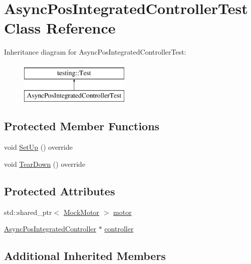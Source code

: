 \hypertarget{classAsyncPosIntegratedControllerTest}{}\section{Async\+Pos\+Integrated\+Controller\+Test Class Reference}
\label{classAsyncPosIntegratedControllerTest}
Inheritance diagram for Async\+Pos\+Integrated\+Controller\+Test\+:\begin{figure}[H]
\begin{center}
\leavevmode
\includegraphics[height=2.000000cm]{classAsyncPosIntegratedControllerTest}
\end{center}
\end{figure}
\subsection*{Protected Member Functions}
\begin{DoxyCompactItemize}
\item 
void \mbox{\hyperlink{classAsyncPosIntegratedControllerTest_afd23fe1778071b9ac1cf5aa9dcc6cb22}{Set\+Up}} () override
\item 
void \mbox{\hyperlink{classAsyncPosIntegratedControllerTest_a5c8995c19811db45f812a477eec29404}{Tear\+Down}} () override
\end{DoxyCompactItemize}
\subsection*{Protected Attributes}
\begin{DoxyCompactItemize}
\item 
std\+::shared\+\_\+ptr$<$ \mbox{\hyperlink{classokapi_1_1MockMotor}{Mock\+Motor}} $>$ \mbox{\hyperlink{classAsyncPosIntegratedControllerTest_ae26bfd19b39aa0f501d14ec97b9eaefa}{motor}}
\item 
\mbox{\hyperlink{classokapi_1_1AsyncPosIntegratedController}{Async\+Pos\+Integrated\+Controller}} $\ast$ \mbox{\hyperlink{classAsyncPosIntegratedControllerTest_a33ef7789c5347903d5a77208e25ff1ee}{controller}}
\end{DoxyCompactItemize}
\subsection*{Additional Inherited Members}


